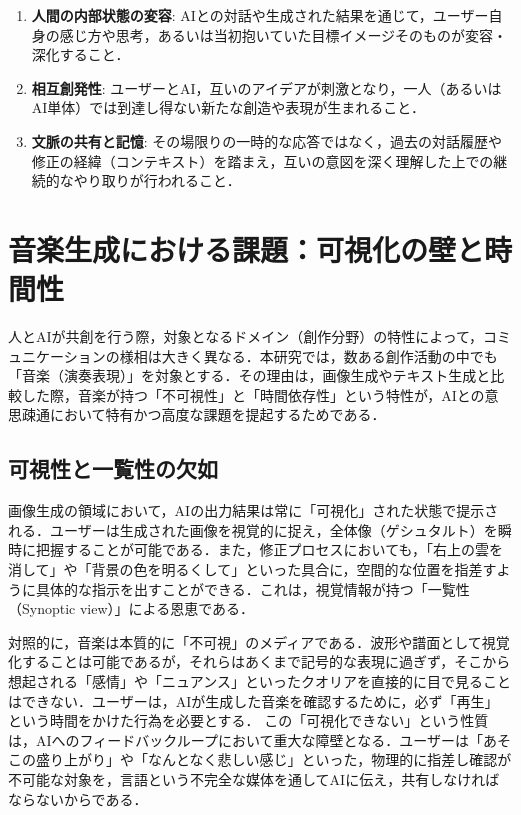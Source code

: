 \begin{enumerate}
    \item \textbf{人間の内部状態の変容}: AIとの対話や生成された結果を通じて，ユーザー自身の感じ方や思考，あるいは当初抱いていた目標イメージそのものが変容・深化すること．
    \item \textbf{相互創発性}: ユーザーとAI，互いのアイデアが刺激となり，一人（あるいはAI単体）では到達し得ない新たな創造や表現が生まれること．
    \item \textbf{文脈の共有と記憶}: その場限りの一時的な応答ではなく，過去の対話履歴や修正の経緯（コンテキスト）を踏まえ，互いの意図を深く理解した上での継続的なやり取りが行われること．
\end{enumerate}

\section{音楽生成における課題：可視化の壁と時間性}
\label{sec:why_music}

人とAIが共創を行う際，対象となるドメイン（創作分野）の特性によって，コミュニケーションの様相は大きく異なる．本研究では，数ある創作活動の中でも「音楽（演奏表現）」を対象とする．その理由は，画像生成やテキスト生成と比較した際，音楽が持つ「不可視性」と「時間依存性」という特性が，AIとの意思疎通において特有かつ高度な課題を提起するためである．

\subsection{可視性と一覧性の欠如}
画像生成の領域において，AIの出力結果は常に「可視化」された状態で提示される．ユーザーは生成された画像を視覚的に捉え，全体像（ゲシュタルト）を瞬時に把握することが可能である．また，修正プロセスにおいても，「右上の雲を消して」や「背景の色を明るくして」といった具合に，空間的な位置を指差すように具体的な指示を出すことができる．これは，視覚情報が持つ「一覧性（Synoptic view）」による恩恵である．

対照的に，音楽は本質的に「不可視」のメディアである．波形や譜面として視覚化することは可能であるが，それらはあくまで記号的な表現に過ぎず，そこから想起される「感情」や「ニュアンス」といったクオリアを直接的に目で見ることはできない．ユーザーは，AIが生成した音楽を確認するために，必ず「再生」という時間をかけた行為を必要とする．
この「可視化できない」という性質は，AIへのフィードバックループにおいて重大な障壁となる．ユーザーは「あそこの盛り上がり」や「なんとなく悲しい感じ」といった，物理的に指差し確認が不可能な対象を，言語という不完全な媒体を通してAIに伝え，共有しなければならないからである．

